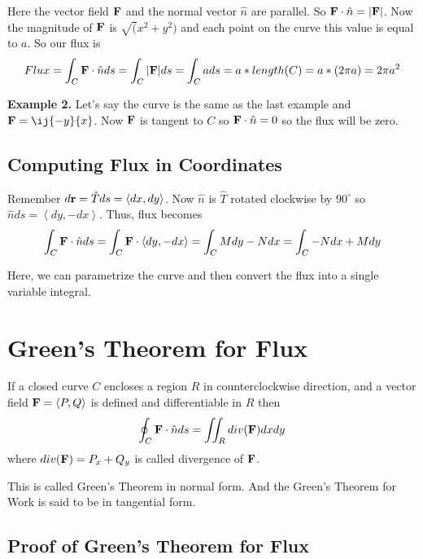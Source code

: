 Here the vector field ${\bf F}$ and the normal vector $\hat{n}$ are parallel. So ${\bf F} \cdot \hat{n} = |{\bf F}|$.
Now the magnitude of ${\bf F}$ is $\sqrt(x^2+y^2)$ and each point on the curve this value is equal to $a$.
So our flux is 
$$ Flux = \int_C {\bf F} \cdot \hat{n} ds = \int_C |{\bf F}| ds = \int_C a ds = a * length(C) = a * (2 \pi a) = 2\pi a^2 $$


{\bf Example 2.} Let's say the curve is the same as the last example and ${\bf F} = \ij{-y}{x}$.
Now ${\bf F}$ is tangent to $C$ so ${\bf F} \cdot \hat{n} = 0$ so the flux will be zero.


\subsection{Computing Flux in Coordinates}

Remember $d{\bf r} = \hat{T} ds = \left< dx, dy \right>$.
Now $\hat{n}$ is $\hat{T}$ rotated clockwise by $90^{\circ}$ so $\hat{n} ds = \left< dy, - dx \right>$.
Thus, flux becomes
$$ 
\int_C {\bf F} \cdot \hat{n} ds 
    = \int_C {\bf F} \cdot \left< dy, -dx \right>
    = \int_C Mdy - Ndx
    = \int_C - N dx + M dy
$$

Here, we can parametrize the curve and then convert the flux into a single variable integral.

\pagebreak

\section{Green's Theorem for Flux}

\begin{mdframed}
\begin{center}
If a closed curve $C$ encloses a region $R$ in counterclockwise direction, 
and a vector field ${\bf F} = \left< P, Q \right>$ is defined and differentiable in $R$ then
$$
\oint_C {\bf F} \cdot \hat{n} ds = \iint_R div({\bf F}) dx dy
$$
where $div({\bf F}) = P_x + Q_y$ is called divergence of ${\bf F}$.
\end{center}
\end{mdframed}

This is called Green's Theorem in normal form. 
And the Green's Theorem for Work is said to be in tangential form.

\subsection{Proof of Green's Theorem for Flux}

